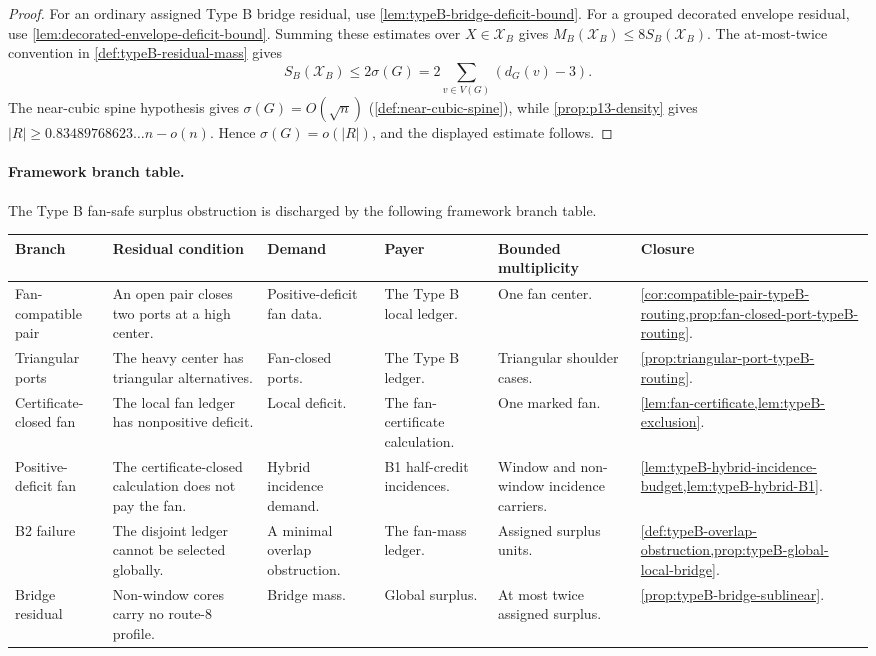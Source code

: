 \documentclass[11pt]{article}
\newcommand{\FrameworkBranchTableHeader}{%
\toprule
\textbf{Branch} & \textbf{Residual condition} & \textbf{Demand} & \textbf{Payer} & \textbf{Bounded multiplicity} & \textbf{Closure}\\
\midrule
}
\begin{document}
\begin{proof}
For an ordinary assigned Type B bridge residual, use
\cref{lem:typeB-bridge-deficit-bound}.  For a grouped decorated envelope
residual, use
\cref{lem:decorated-envelope-deficit-bound}.  Summing these estimates over
\(X\in\mathcal X_B\) gives \(M_B(\mathcal X_B)\le8S_B(\mathcal X_B)\).  The
at-most-twice convention in \cref{def:typeB-residual-mass} gives
\[
S_B(\mathcal X_B)\le
2\sigma(G)=2\sum_{v\in V(G)}(d_G(v)-3).
\]
The near-cubic spine hypothesis gives
$\sigma(G)=O(\sqrt n)$
(\cref{def:near-cubic-spine}), while
\cref{prop:p13-density} gives $|R|\ge0.83489768623\ldots n-o(n)$.  Hence
$\sigma(G)=o(|R|)$, and the displayed estimate follows.
\end{proof}

\paragraph{Framework branch table.}
The Type B fan-safe surplus obstruction is discharged by the following
framework branch table.
\begin{longtable}{L{0.13\textwidth} L{0.19\textwidth} L{0.14\textwidth} L{0.14\textwidth} L{0.17\textwidth} L{0.17\textwidth}}
\FrameworkBranchTableHeader
Fan-compatible pair
&
An open pair closes two ports at a high center.
&
Positive-deficit fan data.
&
The Type B local ledger.
&
One fan center.
&
\cref{cor:compatible-pair-typeB-routing,prop:fan-closed-port-typeB-routing}.
\\
\addlinespace
Triangular ports
&
The heavy center has triangular alternatives.
&
Fan-closed ports.
&
The Type B ledger.
&
Triangular shoulder cases.
&
\cref{prop:triangular-port-typeB-routing}.
\\
\addlinespace
Certificate-closed fan
&
The local fan ledger has nonpositive deficit.
&
Local deficit.
&
The fan-certificate calculation.
&
One marked fan.
&
\cref{lem:fan-certificate,lem:typeB-exclusion}.
\\
\addlinespace
Positive-deficit fan
&
The certificate-closed calculation does not pay the fan.
&
Hybrid incidence demand.
&
B1 half-credit incidences.
&
Window and non-window incidence carriers.
&
\cref{lem:typeB-hybrid-incidence-budget,lem:typeB-hybrid-B1}.
\\
\addlinespace
B2 failure
&
The disjoint ledger cannot be selected globally.
&
A minimal overlap obstruction.
&
The fan-mass ledger.
&
Assigned surplus units.
&
\cref{def:typeB-overlap-obstruction,prop:typeB-global-local-bridge}.
\\
\addlinespace
Bridge residual
&
Non-window cores carry no route-8 profile.
&
Bridge mass.
&
Global surplus.
&
At most twice assigned surplus.
&
\cref{prop:typeB-bridge-sublinear}.
\\
\bottomrule
\end{longtable}
\end{document}

